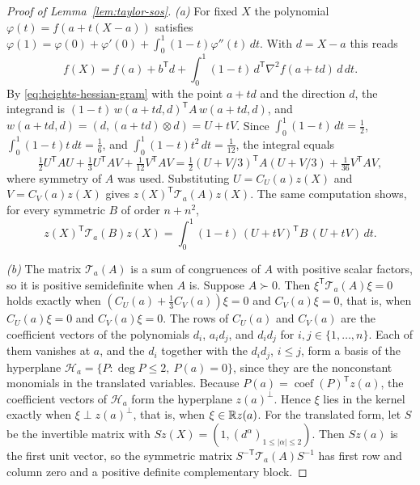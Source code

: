\begin{proof}[Proof of Lemma~\ref{lem:taylor-sos}]
\emph{(a)} For fixed $X$ the polynomial $\varphi(t)=f(a+t(X-a))$ satisfies
$\varphi(1)=\varphi(0)+\varphi'(0)+\int_0^1(1-t)\varphi''(t)\,dt$. With
$d=X-a$ this reads
\[
 f(X)=f(a)+b^{\mathsf T}d+\int_0^1(1-t)\,d^{\mathsf T}\nabla^2f(a+td)\,d\,dt.
\]
By \eqref{eq:heights-hessian-gram} with the point $a+td$ and the direction
$d$, the integrand is $(1-t)\,w(a+td,d)^{\mathsf T}A\,w(a+td,d)$, and
$w(a+td,d)=(d,(a+td)\otimes d)=U+tV$. Since
$\int_0^1(1-t)\,dt=\frac12$, $\int_0^1(1-t)t\,dt=\frac16$, and
$\int_0^1(1-t)t^2\,dt=\frac1{12}$, the integral equals
\[
 \tfrac12U^{\mathsf T}AU+\tfrac13U^{\mathsf T}AV+\tfrac1{12}V^{\mathsf T}AV
 =\tfrac12(U+V/3)^{\mathsf T}A(U+V/3)+\tfrac1{36}V^{\mathsf T}AV,
\]
where symmetry of $A$ was used. Substituting $U=C_U(a)z(X)$ and
$V=C_V(a)z(X)$ gives
$z(X)^{\mathsf T}\mathcal T_a(A)z(X)$. The same computation shows, for every
symmetric $B$ of order $n+n^2$,
\begin{equation}
 z(X)^{\mathsf T}\mathcal T_a(B)z(X)
 =\int_0^1(1-t)\,(U+tV)^{\mathsf T}B\,(U+tV)\,dt.
 \label{eq:heights-taylor-form}
\end{equation}

\emph{(b)} The matrix $\mathcal T_a(A)$ is a sum of congruences of $A$ with
positive scalar factors, so it is positive semidefinite when $A$ is. Suppose
$A\succ0$. Then $\xi^{\mathsf T}\mathcal T_a(A)\xi=0$ holds exactly when
$(C_U(a)+\frac13C_V(a))\xi=0$ and $C_V(a)\xi=0$, that is, when
$C_U(a)\xi=0$ and $C_V(a)\xi=0$. The rows of $C_U(a)$ and $C_V(a)$ are the
coefficient vectors of the polynomials $d_i$, $a_id_j$, and $d_id_j$ for
$i,j\in\{1,\ldots,n\}$. Each of them vanishes at $a$, and the $d_i$ together
with the $d_id_j$, $i\le j$, form a basis of the hyperplane
$\mathcal H_a=\{P:\deg P\le2,\ P(a)=0\}$, since they are the nonconstant
monomials in the translated variables. Because
$P(a)=\operatorname{coef}(P)^{\mathsf T}z(a)$, the coefficient vectors of
$\mathcal H_a$ form the hyperplane $z(a)^\perp$. Hence $\xi$ lies in the kernel
exactly when $\xi\perp z(a)^\perp$, that is, when $\xi\in\mathbb R z(a)$. For the
translated form, let $S$ be the invertible matrix with
$Sz(X)=(1,(d^\alpha)_{1\le|\alpha|\le2})$. Then $Sz(a)$ is the first unit
vector, so the symmetric matrix $S^{-\mathsf T}\mathcal T_a(A)S^{-1}$ has
first row and column zero and a positive definite complementary block.


\end{proof}
